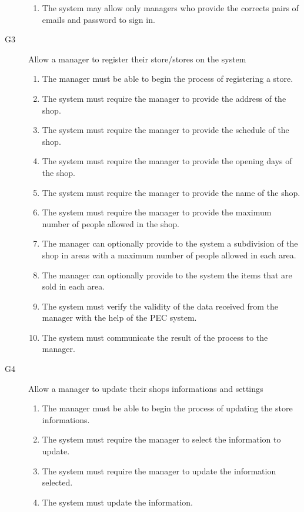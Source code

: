 \begin{description}
\begin{enumerate}[resume*]
            \item The system may allow only managers who provide the corrects pairs of emails and password to sign in.
        \end{enumerate}
    \item [G3] Allow a manager to register their store/stores on the system
        \begin{enumerate}[resume*]
            \item The manager must be able to begin the process of registering a store.
            \item The system must require the manager to provide the address of the shop.
            \item The system must require the manager to provide the schedule of the shop.
            \item The system must require the manager to provide the opening days of the shop.
            \item The system must require the manager to provide the name of the shop.
            \item The system must require the manager to provide the maximum number of people allowed in the shop.
            \item The manager can optionally provide to the system a subdivision of the shop in areas with a maximum number of people allowed in each area.
            \item The manager can optionally provide to the system the items that are sold in each area.
            \item The system must verify the validity of the data received from the manager with the help of the PEC system.
            \item The system must communicate the result of the process to the manager.
        \end{enumerate}
    \item [G4] Allow a manager to update their shops informations and settings
        \begin{enumerate}[resume*]
            \item The manager must be able to begin the process of updating the store informations.
            \item The system must require the manager to select the information to update.
            \item The system must require the manager to update the information selected.
            \item The system must update the information.

\end{enumerate}
\end{description}
